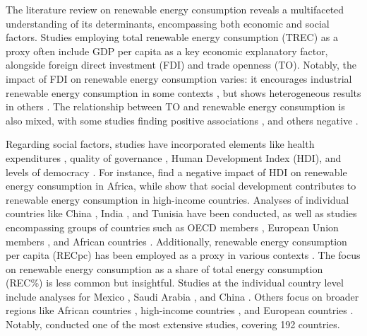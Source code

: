 \documentclass[a4paper,11pt]{article}
\begin{document}
The literature review on renewable energy consumption reveals a multifaceted understanding of its determinants, encompassing both economic and social factors. Studies employing total renewable energy consumption (TREC) as a proxy often include GDP per capita as a key economic explanatory factor, alongside foreign direct investment (FDI) and trade openness (TO). Notably, the impact of FDI on renewable energy consumption varies: it encourages industrial renewable energy consumption in some contexts \textcite{ref22}, but shows heterogeneous results in others \parencite{ref7,ref28,ref31}. The relationship between TO and renewable energy consumption is also mixed, with some studies finding positive associations \parencite{ref5,ref6,ref42,ref48}, and others negative \parencite{ref22,ref24,ref28,ref55}.

Regarding social factors, studies have incorporated elements like health expenditures \parencite{ref11}, quality of governance \parencite{ref13}, Human Development Index (HDI), and levels of democracy \parencite{ref22,ref29}. For instance, \textcite{ref22} find a negative impact of HDI on renewable energy consumption in Africa, while \textcite{ref29} show that social development contributes to renewable energy consumption in high-income countries. Analyses of individual countries like China \parencite{ref16,ref32,ref55}, India \parencite{ref20}, and Tunisia \parencite{ref15,ref17} have been conducted, as well as studies encompassing groups of countries such as OECD members \parencite{ref9,ref46,ref47}, European Union members \parencite{ref7,ref33,ref34}, and African countries \parencite{ref1,ref13,ref40}. Additionally, renewable energy consumption per capita (RECpc) has been employed as a proxy in various contexts \parencite{ref10,ref24,ref43,ref45}. The focus on renewable energy consumption as a share of total energy consumption (REC\%) is less common but insightful. Studies at the individual country level include analyses for Mexico \parencite{ref35}, Saudi Arabia \parencite{ref50}, and China \parencite{ref31}. Others focus on broader regions like African countries \parencite{ref11,ref22}, high-income countries \parencite{ref29}, and European countries \parencite{ref7,ref34}. Notably, \textcite{ref28} conducted one of the most extensive studies, covering 192 countries.
\end{document}
